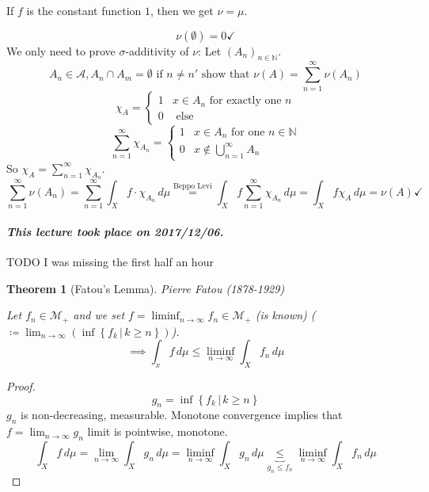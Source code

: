 \documentclass{article}
\newtheorem{theorem}{Theorem}  \numberwithin{theorem}{section}
\newcommand{\setdef}[2]{\left\{\left.#1\,\right|\,#2\right\}}
\newcommand{\dateref}[1]{\paragraph{\textit{This lecture took place on #1.}}}
\begin{document}
If $f$ is the constant function $1$, then we get $\nu = \mu$.

\[ \nu(\emptyset) = 0 \checkmark \]
We only need to prove $\sigma$-additivity of $\nu$:
Let $(A_n)_{n\in\mathbb N}$.
\[ A_n \in \mathcal A, A_n \cap A_m = \emptyset \text{ if } n \neq n' \text{ show that } \nu(A) = \sum_{n=1}^\infty \nu(A_n) \]
\[ \chi_A = \begin{cases} 1 & x \in A_n \text{ for exactly one } n \\ 0 & \text{ else} \end{cases} \]
\[ \sum_{n=1}^\infty \chi_{A_n} = \begin{cases} 1 & x \in A_n \text{ for one } n \in \mathbb N \\ 0 & x \not\in \bigcup_{n=1}^\infty A_n \end{cases} \]
So $\chi_A = \sum_{n=1}^\infty \chi_{A_n}$.
\[ \sum_{n=1}^\infty \nu(A_n) = \sum_{n=1}^\infty \int_X f \cdot \chi_{A_n} \, d\mu \stackrel{\text{Beppo Levi}}{=} \int_X f \sum_{n=1}^\infty \chi_{A_n} \, d\mu = \int_X f \chi_{A} \, d\mu = \nu(A) \checkmark \]

\dateref{2017/12/06}

TODO I was missing the first half an hour

\begin{theorem}[Fatou's Lemma]
  Pierre Fatou (1878-1929)

  Let $f_n \in \mathcal M_+$ and we set $f = \liminf_{n\to\infty} f_n \in \mathcal M_+$ (is known) ($\coloneqq \lim_{n\to\infty}(\inf\setdef{f_k}{k \geq n})$).
  \[ \implies \int_x f \, d\mu \leq \liminf_{n\to\infty} \int_X f_n \, d\mu \]
\end{theorem}
\begin{proof}
  \[ g_n = \inf\setdef{f_k}{k \geq n} \]
  $g_n$ is non-decreasing, measurable.
  Monotone convergence implies that $f = \lim_{n\to\infty} g_n$ limit is pointwise, monotone.
  \[ \int_X f \, d\mu = \lim_{n\to\infty} \int_X g_n \, d\mu = \liminf_{n\to\infty} \int_X g_n \, d\mu \underbrace{\leq}_{g_n \leq f_n} \liminf_{n\to\infty} \int_X f_n \, d\mu \]
\end{proof}
\end{document}
